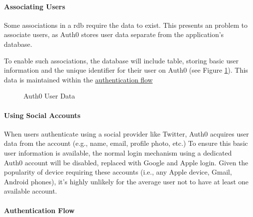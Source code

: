 \paragraph{Associating Users}
Some associations in a \gls{rdb} require the data to exist.
This presents an problem to associate users, as Auth0
stores user data separate from the application's database.

To enable such associations, the database will include
 table, storing basic user information and the
unique identifier for their user on Auth0 (see Figure
\ref{fig:auth0Data}).
This data is maintained within the
\hyperref[p:authFlow]{authentication flow}

\begin{figure}  \caption{Auth0 User Data}
  \label{fig:auth0Data}
\end{figure}

\paragraph{Using Social Accounts}
When users authenticate using a social provider like
Twitter, Auth0 acquires user data from the account (e.g.,
name, email, profile photo, etc.)
To ensure this basic user information is available, the
normal login mechanism using a dedicated Auth0 account will
be disabled, replaced with Google and Apple login.
Given the popularity of device requiring these accounts
(i.e., any Apple device, Gmail, Android phones), it's
highly unlikely for the average user not to have at least
one available account.

\paragraph{Authentication Flow}
\label{p:authFlow}

